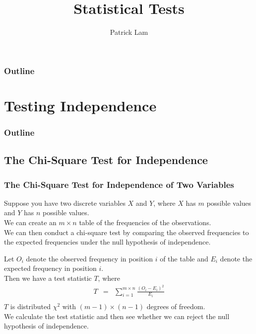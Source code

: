 \documentclass{beamer}
\author{Patrick Lam}
\title{Statistical Tests}
\date{}
\begin{document}
\newcommand{\red}{\textcolor{red}}
\newcommand{\blue}{\textcolor{blue}}
\newcommand{\purple}{\textcolor{purple}}

\frame{\titlepage}

\begin{frame}
\frametitle{Outline}
\tableofcontents
\end{frame}

\section{Testing Independence}

\begin{frame}
\frametitle{Outline}
\tableofcontents[currentsection]
\end{frame}

\subsection{The Chi-Square Test for Independence}

\begin{frame}
\frametitle{The Chi-Square Test for Independence of Two Variables}
\pause
Suppose you have two discrete variables $X$ and $Y$, where $X$ has $m$
possible values and $Y$ has $n$ possible values.\\
\pause
\bigskip
We can create an $m \times n$ table of the frequencies of the
observations.\\
\pause
\bigskip
We can then conduct a chi-square test by comparing the observed frequencies to the expected
frequencies under the null hypothesis of independence.
\end{frame}

\begin{frame}
Let $O_{i}$ denote the observed frequency in position $i$ of the table
and $E_i$ denote the expected frequency in position $i$.\\
\pause
\bigskip
Then we have a test statistic $T$, where 
\pause
\begin{eqnarray*}
T &=& \sum_{i=1}^{m \times n} \frac{(O_i - E_i)^2}{E_i}\\
\end{eqnarray*}
\pause
$T$ is distributed $\chi^2$ with $(m-1) \times (n-1)$ degrees of freedom.\\
\bigskip
\pause
We calculate the test statistic and then see whether we can reject the
null hypothesis of independence.
\end{frame}
\end{document}
